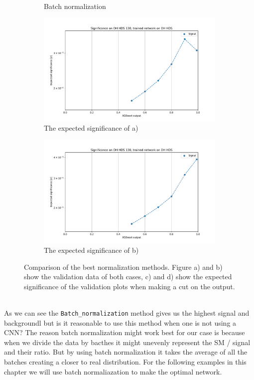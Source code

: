 \documentclass[12pt, a4paper]{book}
\begin{document}
\begin{figure}[!ht]
\begin{subfigure}[b]{0.49\textwidth}
      \caption{Batch normalization}
   \end{subfigure}
   \hfill
   \begin{subfigure}[b]{0.49\textwidth}
      \centering
      \includegraphics[width=1\textwidth]{Z_score/EXP_SIG.pdf}
      \caption{The expected significance of a)}
   \end{subfigure}
   \hfill
   \begin{subfigure}[b]{0.49\textwidth}
      \centering
      \includegraphics[width=1\textwidth]{BatchNorm/EXP_SIG.pdf}
      \caption{The expected significance of b)}
   \end{subfigure}
   \caption[Comparison of best NN normalization methods and expected significance calulcation]{Comparison of the best normalization methods. Figure a) and b) show the validation data of both cases, c) and d) show the expected significance of the validation plots when making a cut on the output. }\label{fig:BestNormie}
\end{figure}
\\As we can see the \verb|Batch_normalization| method gives us the highest signal and backgroundl but is it reasonable to use this method when one is not using a CNN? The reason batch normalization might work best for our case is because when we divide the data by bacthes it might unevenly represent the SM / signal and 
their ratio. But by using batch normalization it takes the average of all the batches creating a closer to real distribution. For the following examples in this chapter we will use batch normaliazation to make the optimal network.\\ 
\clearpage
\end{document}
